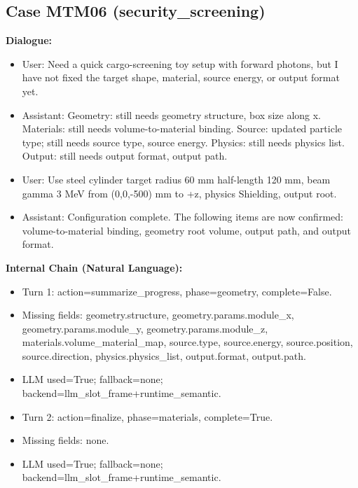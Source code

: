 \documentclass[11pt]{ctexart}
\begin{document}
\subsection{Case MTM06 (security\_screening)}
\textbf{Dialogue:}
\begin{itemize}
\item User: Need a quick cargo-screening toy setup with forward photons, but I have not fixed the target shape, material, source energy, or output format yet.
\item Assistant: Geometry: still needs geometry structure, box size along x. Materials: still needs volume-to-material binding. Source: updated particle type; still needs source type, source energy. Physics: still needs physics list. Output: still needs output format, output path.
\item User: Use steel cylinder target radius 60 mm half-length 120 mm, beam gamma 3 MeV from (0,0,-500) mm to +z, physics Shielding, output root.
\item Assistant: Configuration complete. The following items are now confirmed: volume-to-material binding, geometry root volume, output path, and output format.
\end{itemize}
\textbf{Internal Chain (Natural Language):}
\begin{itemize}
\item Turn 1: action=summarize\_progress, phase=geometry, complete=False.
\item Missing fields: geometry.structure, geometry.params.module\_x, geometry.params.module\_y, geometry.params.module\_z, materials.volume\_material\_map, source.type, source.energy, source.position, source.direction, physics.physics\_list, output.format, output.path.
\item LLM used=True; fallback=none; backend=llm\_slot\_frame+runtime\_semantic.
\item Turn 2: action=finalize, phase=materials, complete=True.
\item Missing fields: none.
\item LLM used=True; fallback=none; backend=llm\_slot\_frame+runtime\_semantic.
\end{itemize}
\end{document}
